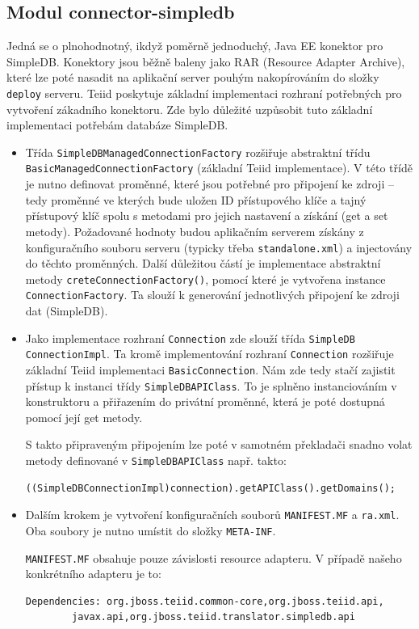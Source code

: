 \documentclass[oneside,11pt]{fithesis2}
\begin{document}
\subsection*{Modul connector-simpledb}
Jedná se o plnohodnotný, ikdyž poměrně jednoduchý, Java EE konektor pro SimpleDB. Konektory jsou běžně baleny jako RAR (Resource Adapter Archive), které lze poté nasadit na aplikační server pouhým nakopírováním do složky \texttt{deploy} serveru. Teiid poskytuje základní implementaci rozhraní potřebných pro vytvoření zákadního konektoru. Zde bylo důležité uzpůsobit tuto základní implementaci potřebám databáze SimpleDB. 
\begin{itemize}
 \item Třída \texttt{SimpleDBManagedConnectionFactory} rozšiřuje abstraktní třídu \texttt{BasicManagedConnectionFactory} (základní Teiid implementace). V této třídě je nutno definovat proměnné, které jsou potřebné pro připojení ke zdroji -- tedy proměnné ve kterých bude uložen ID přístupového klíče a tajný přístupový klíč spolu s metodami pro jejich nastavení a získání (get a set metody). Požadované hodnoty budou aplikačním serverem získány z konfiguračního souboru serveru (typicky třeba \texttt{standalone.xml}) a injectovány do těchto proměnných. Další důležitou částí je implementace abstraktní metody \texttt{creteConnectionFactory()}, pomocí které je vytvořena instance \texttt{ConnectionFactory}. Ta slouží k generování jednotlivých připojení ke zdroji dat (SimpleDB).
 \item Jako implementace rozhraní \texttt{Connection} zde slouží třída \texttt{SimpleDB ConnectionImpl}. Ta kromě implementování rozhraní \texttt{Connection} rozšiřuje základní Teiid implementaci \texttt{BasicConnection}. Nám zde tedy stačí zajistit přístup k instanci třídy \texttt{SimpleDBAPIClass}. To je splněno instanciováním v konstruktoru a přiřazením do privátní proměnné, která je poté dostupná pomocí její get metody.
 
 S takto připraveným připojením lze poté v samotném překladači snadno volat metody definované v \texttt{SimpleDBAPIClass} např. takto:
 \begin{Verbatim}[fontsize=\small]
((SimpleDBConnectionImpl)connection).getAPIClass().getDomains();
 \end{Verbatim}
 \item Dalším krokem je vytvoření konfiguračních souborů \texttt{MANIFEST.MF} a \texttt{ra.xml}. Oba soubory je nutno umístit do složky \texttt{META-INF}. 
 
 \texttt{MANIFEST.MF} obsahuje pouze závislosti resource adapteru. V případě našeho konkrétního adapteru je to:
 \begin{Verbatim}[fontsize=\small]
Dependencies: org.jboss.teiid.common-core,org.jboss.teiid.api,
	    javax.api,org.jboss.teiid.translator.simpledb.api
 \end{Verbatim}
 

\end{itemize}
\end{document}

